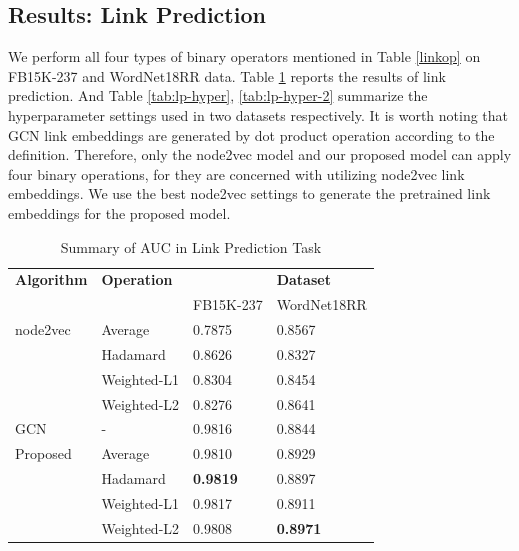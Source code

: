 \documentclass[sigconf]{acmart}
\begin{document}
\subsection{Results: Link Prediction}
We perform all four types of binary operators mentioned in Table \ref{linkop} on FB15K-237 and WordNet18RR data. Table \ref{tab:lp} reports the results of link prediction. And Table \ref{tab:lp-hyper}, \ref{tab:lp-hyper-2} summarize the hyperparameter settings used in two datasets respectively. It is worth noting that GCN link embeddings are generated by dot product operation according to the definition. Therefore, only the node2vec model and our proposed model can apply four binary operations, for they are concerned with utilizing node2vec link embeddings. We use the best node2vec settings to generate the pretrained link embeddings for the proposed model.

\begin{table}[!ht]
    \centering
    \caption{Summary of AUC in Link Prediction Task}
    \label{tab:lp}
    \begin{tabular}{llll}
        \toprule
        \textbf{Algorithm} & \textbf{Operation} & &\textbf{Dataset} \\
                      & & FB15K-237 & WordNet18RR\\
        \midrule
        node2vec & Average & 0.7875 & 0.8567\\
                 & Hadamard & 0.8626 & 0.8327\\
                 & Weighted-L1 & 0.8304 & 0.8454\\
                 & Weighted-L2 & 0.8276 & 0.8641\\
        GCN & - & 0.9816 & 0.8844\\
        Proposed & Average & 0.9810 & 0.8929\\
                 & Hadamard & \textbf{0.9819} & 0.8897\\
                 & Weighted-L1 & 0.9817 & 0.8911\\
                 & Weighted-L2 & 0.9808 & \textbf{0.8971}\\
        \bottomrule
    \end{tabular}
\end{table}
\end{document}
